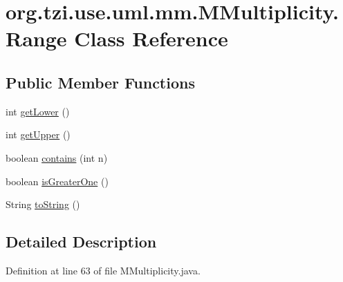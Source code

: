\hypertarget{classorg_1_1tzi_1_1use_1_1uml_1_1mm_1_1_m_multiplicity_1_1_range}{\section{org.\-tzi.\-use.\-uml.\-mm.\-M\-Multiplicity.\-Range Class Reference}
\label{classorg_1_1tzi_1_1use_1_1uml_1_1mm_1_1_m_multiplicity_1_1_range}
}
\subsection*{Public Member Functions}
\begin{DoxyCompactItemize}
\item 
int \hyperlink{classorg_1_1tzi_1_1use_1_1uml_1_1mm_1_1_m_multiplicity_1_1_range_a8a5125ac6197f83ed120de8ffd707208}{get\-Lower} ()
\item 
int \hyperlink{classorg_1_1tzi_1_1use_1_1uml_1_1mm_1_1_m_multiplicity_1_1_range_ad29eedb39e70636f1bced10da3811c8b}{get\-Upper} ()
\item 
boolean \hyperlink{classorg_1_1tzi_1_1use_1_1uml_1_1mm_1_1_m_multiplicity_1_1_range_aad8b45d053a1b88458994368fc9c9c07}{contains} (int n)
\item 
boolean \hyperlink{classorg_1_1tzi_1_1use_1_1uml_1_1mm_1_1_m_multiplicity_1_1_range_a742693b902a5b096256742eb4581fcb7}{is\-Greater\-One} ()
\item 
String \hyperlink{classorg_1_1tzi_1_1use_1_1uml_1_1mm_1_1_m_multiplicity_1_1_range_a0075827542eff9031d9f9c0904412aea}{to\-String} ()
\end{DoxyCompactItemize}


\subsection{Detailed Description}


Definition at line 63 of file M\-Multiplicity.\-java.




